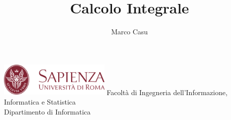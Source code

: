 \documentclass[10pt, letterpaper]{report}
\title{Calcolo Integrale} %
\author{Marco Casu}
\date{\vspace{-5ex}}
\begin{document}
\begin{titlepage}
    \begin{center}
        \HUGE \decothreeleft{}\hphantom{ }\decothreeright
    \end{center}
    \thispagestyle{empty}
    \begin{figure}[h]
    \end{figure}
    \vfill
    \centering \includegraphics[width=0.4\textwidth ]{../../../../../preamble/Stemma_sapienza.png} \acc
    \centering \Large \color{sapienza}Facoltà di Ingegneria dell'Informazione,
    Informatica e Statistica\\
    Dipartimento di Informatica
\end{titlepage}
\end{document}
